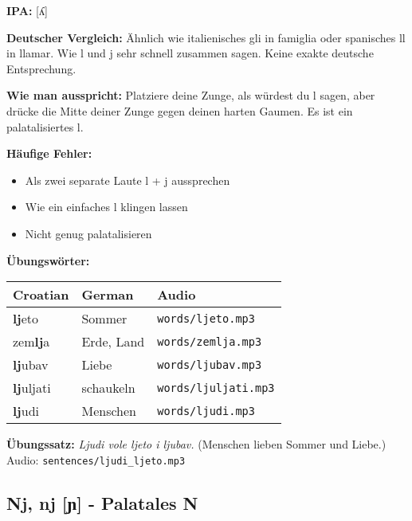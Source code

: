 \begin{tcolorbox}[colback=lightgreen!30, colframe=green!60!black, title=\textbf{Lj, lj}]

\textbf{IPA:} [ʎ]

\textbf{Deutscher Vergleich:}
Ähnlich wie italienisches \glqq gli\grqq{} in \glqq famiglia\grqq{} oder spanisches \glqq ll\grqq{} in \glqq llamar\grqq{}. Wie \glqq l\grqq{} und \glqq j\grqq{} sehr schnell zusammen sagen. Keine exakte deutsche Entsprechung.

\textbf{Wie man ausspricht:}
Platziere deine Zunge, als würdest du \glqq l\grqq{} sagen, aber drücke die Mitte deiner Zunge gegen deinen harten Gaumen. Es ist ein palatalisiertes \glqq l\grqq{}.

\textbf{Häufige Fehler:}
\begin{itemize}
    \item Als zwei separate Laute \glqq l\grqq{} + \glqq j\grqq{} aussprechen
    \item Wie ein einfaches \glqq l\grqq{} klingen lassen
    \item Nicht genug palatalisieren
\end{itemize}

\textbf{Übungswörter:}
\begin{tabular}{lll}
\textbf{Croatian} & \textbf{German} & \textbf{Audio} \\
\midrule
\textbf{lj}eto & Sommer & \texttt{words/ljeto.mp3} \\
zem\textbf{lj}a & Erde, Land & \texttt{words/zemlja.mp3} \\
\textbf{lj}ubav & Liebe & \texttt{words/ljubav.mp3} \\
\textbf{lj}uljati & schaukeln & \texttt{words/ljuljati.mp3} \\
\textbf{lj}udi & Menschen & \texttt{words/ljudi.mp3} \\
\end{tabular}

\textbf{Übungssatz:}
\textit{Ljudi vole ljeto i ljubav.}
(Menschen lieben Sommer und Liebe.)
Audio: \texttt{sentences/ljudi\_ljeto.mp3}

\end{tcolorbox}

\subsection{Nj, nj [ɲ] - \glqq Palatales N\grqq{}}

